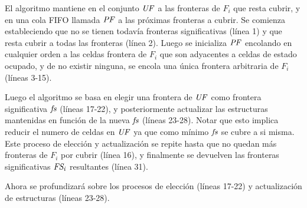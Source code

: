 
El algoritmo mantiene en el conjunto $\mathit{UF}$ a las fronteras de $F_i$ que
resta cubrir, y en una cola FIFO llamada $\mathit{PF}$ a las próximas fronteras a
cubrir. Se comienza estableciendo que no se tienen todavía fronteras
significativas (línea 1) y  que resta cubrir a todas las fronteras (línea 2).
Luego se inicializa $\mathit{PF}$ encolando en cualquier orden a las celdas
frontera de $F_i$ que son adyacentes a celdas de estado ocupado, y de no
existir ninguna, se encola una única frontera arbitraria de $F_i$ (líneas
3-15). 

Luego el algoritmo se basa en elegir una frontera de $\mathit{UF}$ como frontera
significativa $\mathit{fs}$ (líneas 17-22), y posteriormente actualizar las
estructuras mantenidas en función de la nueva $\mathit{fs}$ (líneas 23-28). Notar
que esto implica reducir el numero de celdas en $\mathit{UF}$ ya que como mínimo
$\mathit{fs}$ se cubre a si misma. Este proceso de elección y actualización se
repite hasta que no quedan más fronteras de $F_i$ por cubrir (línea 16),
y finalmente se devuelven las fronteras significativas $\mathit{FS_i}$ resultantes
(línea 31).
 
Ahora se profundizará sobre los procesos de elección (líneas 17-22) y
actualización de estructuras (líneas 23-28).


